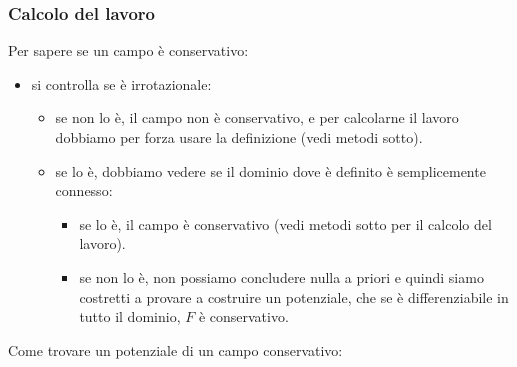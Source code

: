 \subsubsection{Calcolo del lavoro}
Per sapere se un campo è conservativo:
\begin{itemize}
    \item si controlla se è irrotazionale:
    \begin{itemize}
        \item se non lo è, il campo non è conservativo, e per calcolarne il lavoro dobbiamo per forza usare la definizione (vedi metodi sotto).
        \item se lo è, dobbiamo vedere se il dominio dove è definito è semplicemente connesso:
        \begin{itemize}
            \item se lo è, il campo è conservativo (vedi metodi sotto per il calcolo del lavoro).
            \item se non lo è, non possiamo concludere nulla a priori e quindi siamo costretti a provare a costruire un potenziale, che se è differenziabile in tutto il dominio, $F$ è conservativo.
        \end{itemize}
    \end{itemize}
\end{itemize}
Come trovare un potenziale di un campo conservativo:
